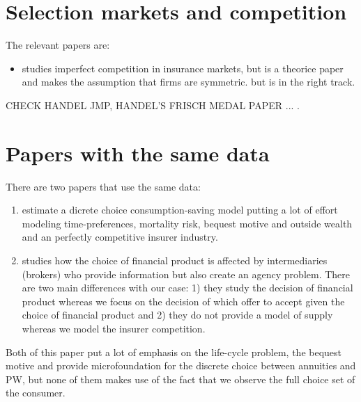 \documentclass[12pt]{article}
\theoremstyle{plain}
\theoremstyle{plain}
\begin{document}
\section{Selection markets and competition}
The relevant papers are: 
\begin{itemize}
    \item \textcite{mahoney_imperfect_2017} studies imperfect competition in insurance markets, but is a theorice paper and makes the assumption that firms are symmetric. but is in the right track. 
\end{itemize}


CHECK HANDEL JMP, HANDEL'S FRISCH MEDAL PAPER ... .






\section{Papers with the same data}

There are two papers that use the same data: 
\begin{enumerate}
    \item \textcite{illanes_retirement_2019} 
    estimate a dicrete choice consumption-saving model putting a lot of effort modeling time-preferences, mortality risk, bequest motive and outside wealth and an perfectly competitive insurer industry. 
    
    \item \textcite{boehm_intermediation_2024} studies how the choice of financial product is affected by intermediaries (brokers) who provide information but also create an agency problem. There are two main differences with our case: 1) they study the decision of financial product whereas we focus on the decision of which offer to accept given the choice of financial product and 2) they do not provide a model of supply whereas we model the insurer competition. 
\end{enumerate}
Both of this paper put a lot of emphasis on the life-cycle problem, the bequest motive and provide microfoundation for the discrete choice between annuities and PW, but none of them makes use of the fact that we observe the full choice set of the consumer. 




\printbibliography
 
\end{document}
